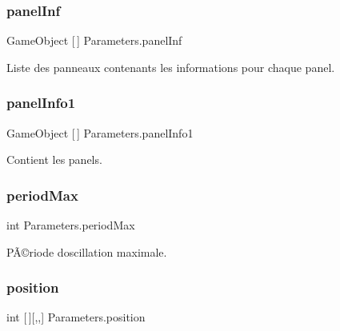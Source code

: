 \subsubsection{\texorpdfstring{panel\+Inf}{panelInf}}
{\footnotesize\ttfamily Game\+Object \mbox{[}$\,$\mbox{]} Parameters.\+panel\+Inf\hspace{0.3cm}{\ttfamily [private]}}



Liste des panneaux contenants les informations pour chaque panel. 

\mbox{\label{class_parameters_a21e4cca4e061b650741354680361136c}} 
\subsubsection{\texorpdfstring{panel\+Info1}{panelInfo1}}
{\footnotesize\ttfamily Game\+Object \mbox{[}$\,$\mbox{]} Parameters.\+panel\+Info1\hspace{0.3cm}{\ttfamily [private]}}



Contient les panels. 

\mbox{\label{class_parameters_a5f6937553d6c12a654fb93e1b6838d53}} 
\subsubsection{\texorpdfstring{period\+Max}{periodMax}}
{\footnotesize\ttfamily int Parameters.\+period\+Max\hspace{0.3cm}{\ttfamily [private]}}



PÃ©riode d\textquotesingle{}oscillation maximale. 

\mbox{\label{class_parameters_ad01c1db17d90b97c666abf21a9c6fcd1}} 
\subsubsection{\texorpdfstring{position}{position}}
{\footnotesize\ttfamily int \mbox{[}$\,$\mbox{]}\mbox{[},,\mbox{]} Parameters.\+position}

